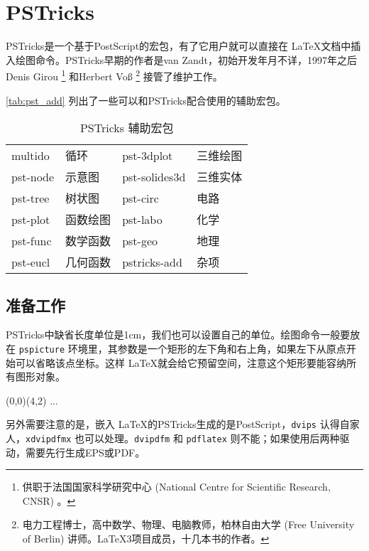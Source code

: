 \chapter{PSTricks}
\label{sec:pstricks}

PSTricks是一个基于PostScript的宏包，有了它用户就可以直接在 \LaTeX 文档中插入绘图命令。PSTricks早期的作者是van Zandt\indexVanZandt ，初始开发年月不详，1997年之后Denis Girou\indexGirou{} \footnote{供职于法国国家科学研究中心 (National Centre for Scientific Research, CNSR) 。} 和Herbert Voß\indexVoss{} \footnote{电力工程博士，高中数学、物理、电脑教师，柏林自由大学 (Free University of Berlin) 讲师。\LaTeX{}3项目成员，十几本书的作者。} 接管了维护工作。

\autoref{tab:pst_add} 列出了一些可以和PSTricks配合使用的辅助宏包。

\begin{table}[htbp]
\caption{PSTricks 辅助宏包}
\label{tab:pst_add}
\centering
\begin{tabular}{llll}
    \toprule
    multido & 循环      & pst-3dplot & 三维绘图 \\
    pst-node & 示意图   & pst-solides3d & 三维实体 \\
    pst-tree & 树状图   & pst-circ & 电路 \\
    pst-plot & 函数绘图 & pst-labo & 化学 \\
    pst-func & 数学函数 & pst-geo & 地理 \\
    pst-eucl & 几何函数 & pstricks-add & 杂项 \\
    \bottomrule
\end{tabular}
\end{table}

\section{准备工作}
\label{sec:pst_setup}

PSTricks中缺省长度单位是1cm，我们也可以设置自己的单位。绘图命令一般要放在 \texttt{pspicture} 环境里，其参数是一个矩形的左下角和右上角，如果左下从原点开始可以省略该点坐标。这样 \LaTeX 就会给它预留空间，注意这个矩形要能容纳所有图形对象。

\begin{Code}[]
\begin{pspicture}(0,0)(4,2)
...
\end{pspicture}
\end{Code}

另外需要注意的是，嵌入 \LaTeX 的PSTricks生成的是PostScript，\texttt{dvips} 认得自家人，\texttt{xdvipdfmx} 也可以处理。\texttt{dvipdfm} 和 \texttt{pdflatex} 则不能；如果使用后两种驱动，需要先行生成EPS或PDF。

